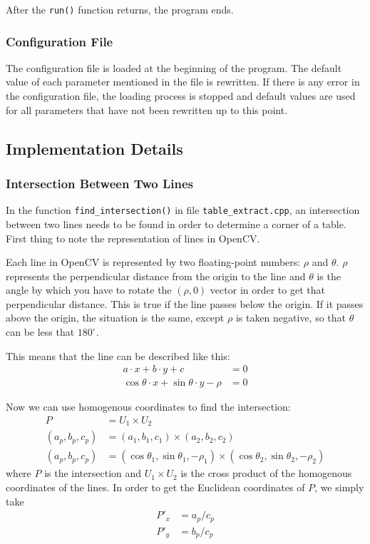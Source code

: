 \documentclass{article}
\begin{document}
{{{		After the \verb+run()+ function returns, the program ends.
		}

		\subsubsection{Configuration File}{
		The configuration file is loaded at the beginning of the program. The default value of each parameter mentioned in the file is rewritten. If there is any error in the configuration file, the loading process is stopped and default values are used for all parameters that have not been rewritten up to this point.
		}
	}

	\subsection{Implementation Details}{
		\subsubsection{Intersection Between Two Lines}{
		In the function \verb+find_intersection()+ in file \verb+table_extract.cpp+, an intersection between two lines needs to be found in order to determine a corner of a table. First thing to note the representation of lines in OpenCV.

		Each line in OpenCV is represented by two floating-point numbers: $\rho$ and $\theta$. $\rho$ represents the perpendicular distance from the origin to the line and $\theta$ is the angle by which you have to rotate the $(\rho, 0)$ vector in order to get that perpendicular distance. This is true if the line passes below the origin. If it passes above the origin, the situation is the same, except $\rho$ is taken negative, so that $\theta$ can be less that $180^\circ$.

		This means that the line can be described like this:
		\begin{align*}
			a \cdot x + b \cdot y + c &= 0 \\
			\cos \theta \cdot x + \sin \theta \cdot y - \rho &= 0
		\end{align*}

		Now we can use homogenous coordinates to find the intersection:
		\begin{align*}
			P &= U_1 \times U_2 \\
			(a_p, b_p, c_p) &= (a_1, b_1, c_1) \times (a_2, b_2, c_2) \\
			(a_p, b_p, c_p) &= (\cos \theta_1, \sin \theta_1, -\rho_1) \times (\cos \theta_2, \sin \theta_2, -\rho_2)
		\end{align*}
		where $P$ is the intersection and $U_1 \times U_2$ is the cross product of the homogenous coordinates of the lines. In order to get the Euclidean coordinates of $P$, we simply take
		\begin{align*}
			P'_x &= a_p / c_p \\
			P'_y &= b_p / c_p
		\end{align*}
		}
	}
}
\end{document}
